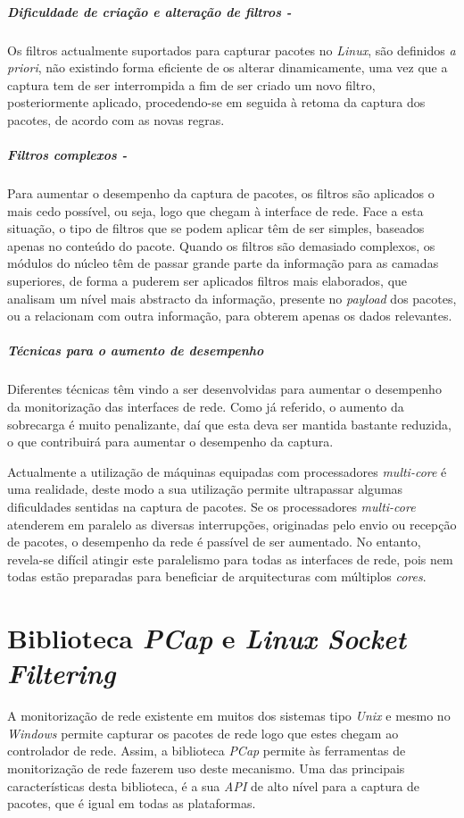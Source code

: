 \subparagraph*{Dificuldade de criação e alteração de filtros - }
Os filtros actualmente suportados para capturar pacotes no \textit{Linux}, são definidos \textit{a priori}, não existindo forma eficiente de os alterar dinamicamente, uma vez que a captura tem de ser interrompida a fim de ser criado um novo filtro, posteriormente aplicado, procedendo-se em seguida à retoma da captura dos pacotes, de acordo com as novas regras.

\subparagraph*{Filtros complexos - }
Para aumentar o desempenho da captura de pacotes, os filtros são aplicados o mais cedo possível, ou seja, logo que chegam à interface de rede.
Face a esta situação, o tipo de filtros que se podem aplicar têm de ser simples, baseados apenas no conteúdo do pacote.
Quando os filtros são demasiado complexos, os módulos do núcleo têm de passar grande parte da informação para as camadas superiores, de forma a puderem ser aplicados filtros mais elaborados, que analisam um nível mais abstracto da informação, presente no \textit{payload} dos pacotes, ou a relacionam com outra informação, para obterem apenas os dados relevantes.

\subparagraph*{Técnicas para o aumento de desempenho}

Diferentes técnicas têm vindo a ser desenvolvidas para aumentar o desempenho da monitorização das interfaces de rede.
Como já referido, o aumento da sobrecarga é muito penalizante, daí que esta deva ser mantida bastante reduzida, o que contribuirá para aumentar o desempenho da captura.

Actualmente a utilização de máquinas equipadas com processadores \textit{multi-core} é uma realidade, deste modo a sua utilização permite ultrapassar algumas dificuldades sentidas na captura de pacotes.
Se os processadores \textit{multi-core} atenderem em paralelo as diversas interrupções, originadas pelo envio ou recepção de pacotes, o desempenho da rede é passível de ser aumentado.
No entanto, revela-se difícil atingir este paralelismo para todas as interfaces de rede, pois nem todas estão preparadas para beneficiar de arquitecturas com múltiplos \textit{cores}.

\section{Biblioteca \textit{PCap} e \textit{Linux Socket Filtering}}\label{sect:LibPcap}

A monitorização de rede existente em muitos dos sistemas tipo \textit{Unix} e mesmo no \textit{Windows} permite capturar os pacotes de rede logo que estes chegam ao controlador de rede.
Assim, a biblioteca \textit{PCap}\cite{LibPcap} permite às ferramentas de monitorização de rede fazerem uso deste mecanismo.
Uma das principais características desta biblioteca, é a sua \textit{API} de alto nível para a captura de pacotes, que é igual em todas as plataformas.

